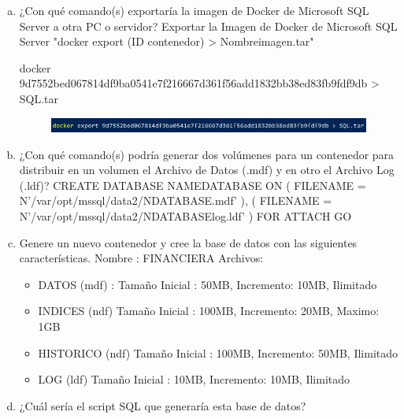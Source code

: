 \documentclass[preprint,12pt]{elsarticle}
\begin{document}
\begin{enumerate}[a)]
\item ¿Con qué comando(s) exportaría la imagen de Docker de Microsoft SQL Server a otra PC o servidor?\newline
Exportar la Imagen de Docker de Microsoft SQL Server
"docker export (ID contenedor) >  Nombreimagen.tar"
\begin{center} docker 9d7552bed067814df9ba0541e7f216667d361f56add1832bb38ed83fb9fdf9db > SQL.tar \end{center}
\begin{figure}[htb]
	\begin{center}
		\includegraphics[width=14cm]{./IMAGENES/Docker17}
	\end{center}
\end{figure}
\item ¿Con qué comando(s) podría generar dos volúmenes para un contenedor para distribuir en un volumen el Archivo de Datos (.mdf) y en otro el Archivo Log (.ldf)?\newline
CREATE DATABASE NAMEDATABASE ON \newline
( FILENAME = N'/var/opt/mssql/data2/NDATABASE.mdf' ),\newline
( FILENAME = N'/var/opt/mssql/data2/NDATABASElog.ldf' )\newline
FOR ATTACH\newline
GO\newline
\item Genere un nuevo contenedor y cree la base de datos con las siguientes características.\newline
Nombre : FINANCIERA \newline
Archivos:
\begin{itemize}
\item DATOS (mdf) : Tamaño Inicial : 50MB, Incremento: 10MB, Ilimitado
\item INDICES (ndf) Tamaño Inicial : 100MB, Incremento: 20MB, Maximo: 1GB
\item HISTORICO (ndf) Tamaño Inicial : 100MB, Incremento: 50MB, Ilimitado
\item LOG (ldf) Tamaño Inicial : 10MB, Incremento: 10MB, Ilimitado
\end{itemize}
\item ¿Cuál sería el script SQL que generaría esta base de datos?
\begin{figure}[htb]
	\begin{center}

\end{center}
\end{figure}
\end{enumerate}
\end{document}
